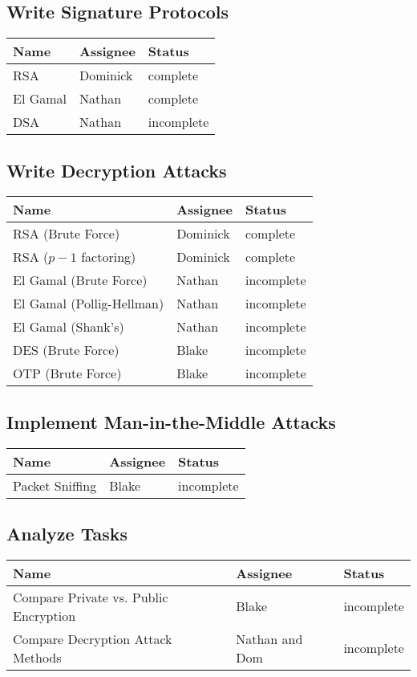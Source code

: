 \documentclass[12pt]{report}
\begin{document}
\subsection{Write Signature Protocols}
\begin{tabular}{l|l|l}
    Name & Assignee & Status \\ \hline
    RSA & Dominick & complete \\
    El Gamal & Nathan & complete \\
    DSA & Nathan & incomplete	 
\end{tabular}

\subsection{Write Decryption Attacks}
\begin{tabular}{l|l|l}
    Name & Assignee & Status \\ \hline
    RSA (Brute Force) & Dominick & complete \\
    RSA ($p-1$ factoring) & Dominick & complete \\
    El Gamal (Brute Force) & Nathan & incomplete \\
    El Gamal (Pollig-Hellman) & Nathan & incomplete \\
    El Gamal (Shank's) & Nathan & incomplete \\
    DES (Brute Force) & Blake & incomplete \\
    OTP (Brute Force) & Blake & incomplete 
\end{tabular}

\subsection{Implement Man-in-the-Middle Attacks}
\begin{tabular}{l|l|l}
    Name & Assignee & Status \\ \hline
    Packet Sniffing & Blake & incomplete 
\end{tabular}

\subsection{Analyze Tasks}
\begin{tabular}{l|l|l}
    Name & Assignee & Status \\ \hline
    Compare Private vs. Public Encryption & Blake & incomplete \\
    Compare Decryption Attack Methods & Nathan and Dom & incomplete
\end{tabular}
\end{document}
